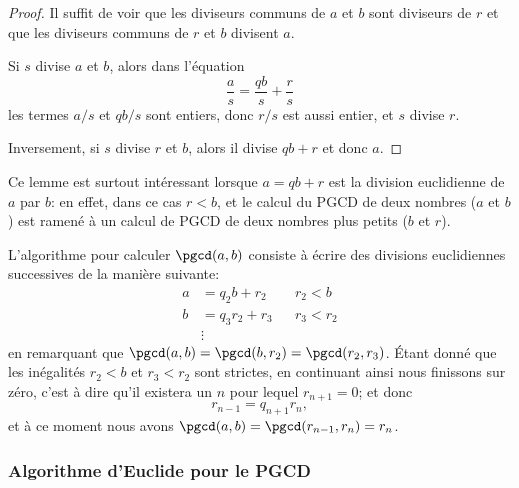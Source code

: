 \begin{proof}
    Il suffit de voir que les diviseurs communs de \( a\) et \( b\) sont diviseurs de \( r\) et que les diviseurs communs de \( r\) et \( b\) divisent \( a\).

    Si \( s\) divise \( a\) et \( b\), alors dans l'équation
    \begin{equation*}
        \frac{ a }{ s }=\frac{ qb }{ s }+\frac{ r }{ s }
    \end{equation*}
    les termes \( a/s\) et \( qb/s\) sont entiers, donc \( r/s\) est aussi entier, et \( s\) divise \( r\).

    Inversement, si \( s\) divise \( r\) et \( b\), alors il divise \( qb+r\) et donc \( a\).
\end{proof}
\begin{remark}
    Ce lemme est surtout intéressant lorsque \( a=qb+r\) est la division euclidienne de \( a\) par \( b\): en effet, dans ce cas \( r < b \), et le calcul du PGCD de deux nombres ($a$ et $b$) est ramené à un calcul de PGCD de deux nombres plus petits ($b$ et $r$).

    L'algorithme pour calculer \( \pgcd(a,b)\) consiste à écrire des divisions euclidiennes successives de la manière suivante:
    \begin{subequations}
        \begin{align}
            a &= q_2 b   + r_2 && r_2<b\\
            b &= q_3 r_2 + r_3 && r_3<r_2\\
            &\vdots
        \end{align}
    \end{subequations}
    en remarquant que \( \pgcd(a,b)=\pgcd(b,r_2)=\pgcd(r_2,r_3) \). Étant donné que les inégalités \( r_2<b\) et \( r_3<r_2\) sont strictes, en continuant ainsi nous finissons sur zéro, c'est à dire qu'il existera un $n$ pour lequel \( r_{n+1} = 0 \); et donc
\begin{equation*}
    r_{n-1}=q_{n+1}r_n,
\end{equation*}
et à ce moment nous avons \( \pgcd(a,b)=\pgcd(r_{n-1},r_n)=r_n\).
\end{remark}

\subsubsection{Algorithme d'Euclide pour le PGCD}
\label{SUBSECooAEBLooFGJRkg}

